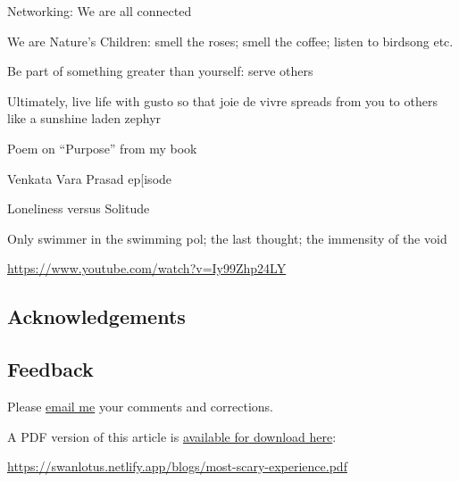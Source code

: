 \documentclass[
  a4paper,
]{article}
\begin{document}
Networking: We are all connected

We are Nature's Children: smell the roses; smell the coffee; listen to
birdsong etc.

Be part of something greater than yourself: serve others

Ultimately, live life with gusto so that joie de vivre spreads from you
to others like a sunshine laden zephyr

Poem on ``Purpose'' from my book

Venkata Vara Prasad ep{[}isode

Loneliness versus Solitude

Only swimmer in the swimming pol; the last thought; the immensity of the
void

\url{https://www.youtube.com/watch?v=Iy99Zhp24LY}

\hypertarget{acknowledgements}{%
\subsection{Acknowledgements}\label{acknowledgements}}

\hypertarget{feedback}{%
\subsection{Feedback}\label{feedback}}

Please \href{mailto:feedback.swanlotus@gmail.com}{email me} your
comments and corrections.

\noindent A PDF version of this article is
\href{./most-scary-experience.pdf}{available for download here}:

\begin{small}

\begin{sffamily}

\url{https://swanlotus.netlify.app/blogs/most-scary-experience.pdf}

\end{sffamily}

\end{small}
\end{document}
